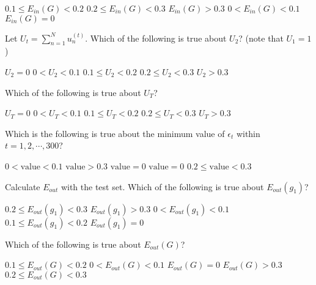 \documentclass[a4paper,10pt]{exam}
\begin{document}
\begin{questions}
\begin{choices}
	\choice $0.1 \le E_{in}(G) < 0.2$
	\choice $0.2 \le E_{in}(G) < 0.3$
	\choice $E_{in}(G) > 0.3$
	\choice $0 < E_{in}(G) < 0.1$
	\CorrectChoice $E_{in}(G) = 0$\\
\end{choices}

\question Let $U_t = \sum_{n=1}^N u_n^{(t)}$. Which of the following is true about $U_2$? (note that $U_1=1$)

\begin{choices}
	\choice $U_2 = 0$
	\choice $0 < U_2 < 0.1$
	\choice $0.1 \le U_2 < 0.2$
	\choice $0.2 \le U_2 < 0.3$
	\CorrectChoice $U_2 > 0.3$\\
\end{choices}

\question Which of the following is true about $U_T$?

\begin{choices}
	\choice $U_T = 0$
	\CorrectChoice $0 < U_T < 0.1$
	\choice $0.1 \le U_T < 0.2$
	\choice $0.2 \le U_T < 0.3$
	\choice $U_T > 0.3$\\
\end{choices}
	
\question Which is the following is true about the minimum value of $\epsilon_t$ within $t = 1, 2, \cdots, 300$?

\begin{choices}
	\choice $0 < \mbox{value} < 0.1$
	\choice $\mbox{value} > 0.3$
	\choice $\mbox{value} = 0$
	\CorrectChoice $\mbox{value} = 0$
	\choice $0.2 \le \mbox{value} < 0.3$  \\
\end{choices}

\question Calculate $E_{out}$ with the test set. Which of the following is true about $E_{out}(g_1)$?

\begin{choices}
	\CorrectChoice $0.2 \le E_{out}(g_1) < 0.3$
	\choice $E_{out}(g_1) > 0.3$
	\choice $0 < E_{out}(g_1) < 0.1$
	\choice $0.1 \le E_{out}(g_1) < 0.2$
	\choice $E_{out}(g_1) = 0$\\
\end{choices}

\question Which of the following is true about $E_{out}(G)$?

\begin{choices}
	\CorrectChoice $0.1 \le E_{out}(G) < 0.2$
	\choice  $0 < E_{out}(G) < 0.1$
	\choice $E_{out}(G) = 0$
	\choice $E_{out}(G) > 0.3$
	\choice $0.2 \le E_{out}(G) < 0.3$\\
\end{choices}


\end{questions}
\end{document}
